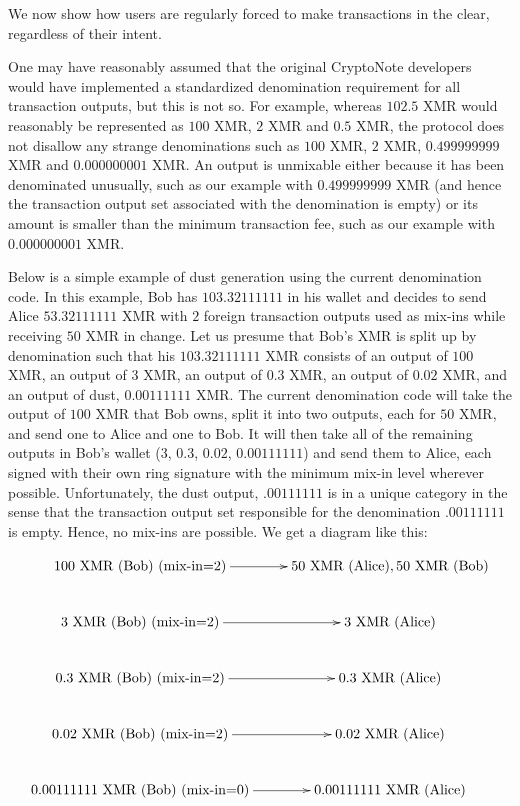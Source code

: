 \documentclass[12pt,english]{mrl}
\theoremstyle{definition}
\numberwithin{equation}{section}
\numberwithin{figure}{section}
\numberwithin{equation}{section}
\numberwithin{equation}{section}
\numberwithin{figure}{section}
\begin{document}
We now show how users are regularly forced to make transactions in the clear, regardless of their intent.

One may have reasonably assumed that the original CryptoNote developers would have implemented a standardized denomination requirement for all transaction outputs, but this is not so. For example, whereas $102.5$ XMR would reasonably be represented as $100$ XMR, $2$ XMR and $0.5$ XMR, the protocol does not disallow any strange denominations such as $100$ XMR, $2$ XMR, $0.499999999$ XMR and $0.000000001$ XMR.  An output is unmixable either because it has been denominated unusually, such as our example with $0.499999999$ XMR (and hence the transaction output set associated with the denomination is empty) or its amount is smaller than the minimum transaction fee, such as our example with $0.000000001$ XMR.

Below is a simple example of dust generation using the current denomination code. In this example, Bob has $103.32111111$ in his wallet and decides to send Alice $53.32111111$ XMR with $2$ foreign transaction outputs used as mix-ins while receiving $50$ XMR in change. Let us presume that Bob's XMR is split up by denomination such that his $103.32111111$ XMR consists of an output of $100$ XMR, an output of $3$ XMR, an output of $0.3$ XMR, an output of $0.02$ XMR, and an output of dust, $0.00111111$ XMR. The current denomination code will take the output of $100$ XMR that Bob owns, split it into two outputs, each for $50$ XMR, and send one to Alice and one to Bob. It will then take all of the remaining outputs in Bob's wallet ($3$, $0.3$, $0.02$, $0.00111111$) and send them to Alice, each signed with their own ring signature with the minimum mix-in level wherever possible. Unfortunately, the dust output, $.00111111$ is in a unique category in the sense that the transaction output set responsible for the denomination $.00111111$ is empty. Hence, no mix-ins are possible. We get a diagram like this:

\begin{align}\label{firstExample}
\xymatrix{
100 \text{~XMR~(Bob)~(mix-in=2)}  \ar[r] &50 \text{~XMR~(Alice)}, 50 \text{~XMR~(Bob)}\\
3 \text{~XMR~(Bob)~(mix-in=2)}    \ar[r] & 3 \text{~XMR~(Alice)}\\
0.3 \text{~XMR~(Bob)~(mix-in=2)} \ar[r] &0.3 \text{~XMR~(Alice)}\\
0.02 \text{~XMR~(Bob)~(mix-in=2)} \ar[r] &0.02 \text{~XMR~(Alice)}\\
0.00111111 \text{~XMR~(Bob)~(mix-in=0)} \ar[r] &0.00111111 \text{~XMR (Alice)}
}
\end{align}
  
\end{document}
